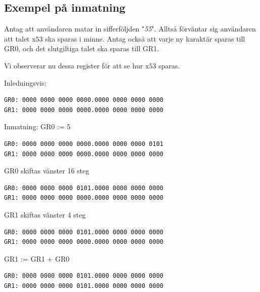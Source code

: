 \documentclass[]{article}
\begin{document}
\begin{appendices}
\section{Exempel på inmatning}\label{app:input_example}
Antag att användaren matar in sifferföljden "\textit{55}". Alltså förväntar sig användaren att talet x$53$ ska sparas i minne. Antag också att varje ny karaktär sparas till GR0, och det slutgiltiga talet ska sparas till GR1.

Vi observerar nu dessa register för att se hur x$53$ sparas.
\newline
\newline

Inledningsvis:
\begin{framed}
\begin{verbatim}
GR0: 0000 0000 0000 0000.0000 0000 0000 0000
GR1: 0000 0000 0000 0000.0000 0000 0000 0000
\end{verbatim}
\end{framed}

Inmatning: GR0 := 5
\begin{framed}
\begin{verbatim}
GR0: 0000 0000 0000 0000.0000 0000 0000 0101
GR1: 0000 0000 0000 0000.0000 0000 0000 0000
\end{verbatim}
\end{framed}

GR0 skiftas vänster 16 steg
\begin{framed}
\begin{verbatim}
GR0: 0000 0000 0000 0101.0000 0000 0000 0000
GR1: 0000 0000 0000 0000.0000 0000 0000 0000
\end{verbatim}
\end{framed}

GR1 skiftas vänster 4 steg
\begin{framed}
\begin{verbatim}
GR0: 0000 0000 0000 0101.0000 0000 0000 0000
GR1: 0000 0000 0000 0000.0000 0000 0000 0000
\end{verbatim}
\end{framed}

GR1 := GR1 + GR0
\begin{framed}
\begin{verbatim}
GR0: 0000 0000 0000 0101.0000 0000 0000 0000
GR1: 0000 0000 0000 0101.0000 0000 0000 0000
\end{verbatim}
\end{framed}


\end{appendices}
\end{document}
